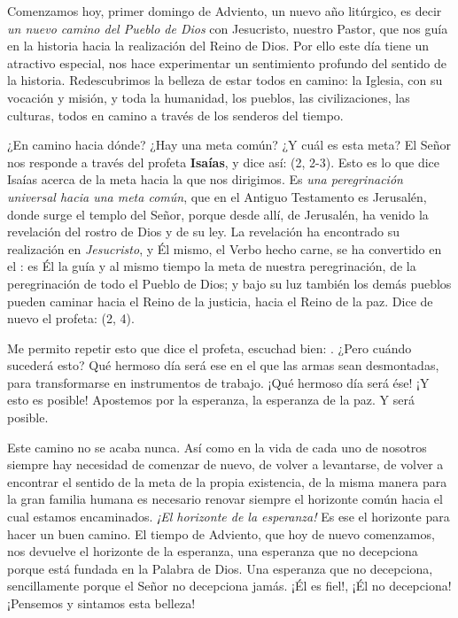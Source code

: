 				\begin{body}
					Comenzamos hoy, primer domingo de Adviento, un nuevo año litúrgico, es decir \emph{un nuevo camino del Pueblo de Dios} con Jesucristo, nuestro Pastor, que nos guía en la historia hacia la realización del Reino de Dios. Por ello este día tiene un atractivo especial, nos hace experimentar un sentimiento profundo del sentido de la historia. Redescubrimos la belleza de estar todos en camino: la Iglesia, con su vocación y misión, y toda la humanidad, los pueblos, las civilizaciones, las culturas, todos en camino a través de los senderos del tiempo.
					
					¿En camino hacia dónde? ¿Hay una meta común? ¿Y cuál es esta meta? El Señor nos responde a través del profeta \textbf{Isaías}, y dice así:  (2, 2-3). Esto es lo que dice Isaías acerca de la meta hacia la que nos dirigimos. Es \emph{una peregrinación universal hacia una meta común}, que en el Antiguo Testamento es Jerusalén, donde surge el templo del Señor, porque desde allí, de Jerusalén, ha venido la revelación del rostro de Dios y de su ley. La revelación ha encontrado su realización en \emph{Jesucristo}, y Él mismo, el Verbo hecho carne, se ha convertido en el : es Él la guía y al mismo tiempo la meta de nuestra peregrinación, de la peregrinación de todo el Pueblo de Dios; y bajo su luz también los demás pueblos pueden caminar hacia el Reino de la justicia, hacia el Reino de la paz. Dice de nuevo el profeta:  (2, 4).
					
					Me permito repetir esto que dice el profeta, escuchad bien: . ¿Pero cuándo sucederá esto? Qué hermoso día será ese en el que las armas sean desmontadas, para transformarse en instrumentos de trabajo. ¡Qué hermoso día será ése! ¡Y esto es posible! Apostemos por la esperanza, la esperanza de la paz. Y será posible.
					
					Este camino no se acaba nunca. Así como en la vida de cada uno de nosotros siempre hay necesidad de comenzar de nuevo, de volver a levantarse, de volver a encontrar el sentido de la meta de la propia existencia, de la misma manera para la gran familia humana es necesario renovar siempre el horizonte común hacia el cual estamos encaminados. \emph{¡El horizonte de la esperanza!} Es ese el horizonte para hacer un buen camino. El tiempo de Adviento, que hoy de nuevo comenzamos, nos devuelve el horizonte de la esperanza, una esperanza que no decepciona porque está fundada en la Palabra de Dios. Una esperanza que no decepciona, sencillamente porque el Señor no decepciona jamás. ¡Él es fiel!, ¡Él no decepciona! ¡Pensemos y sintamos esta belleza!
					

\end{body}
